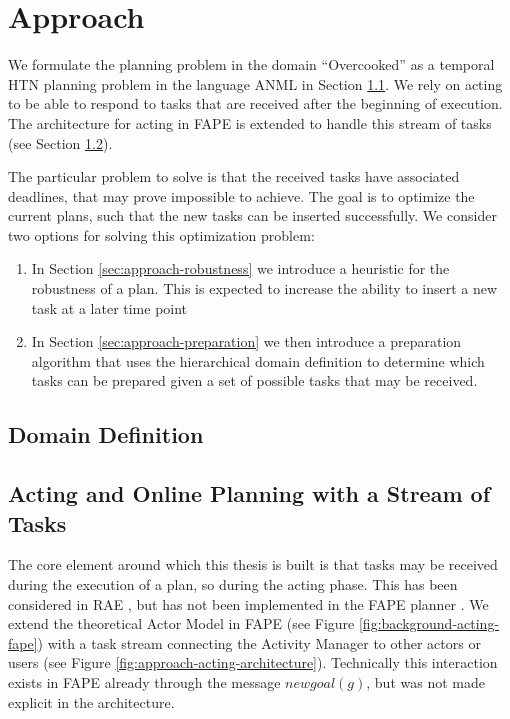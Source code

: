 \section{Approach}\label{sec:approach}


We formulate the planning problem in the domain ``Overcooked'' as a temporal HTN planning problem in the language ANML in Section \ref{sec:approach-domain}.
We rely on acting to be able to respond to tasks that are received after the beginning of execution.
The architecture for acting in FAPE \cite{bit-monnotTemporalHierarchicalModels2016a} is extended to handle this stream of tasks (see Section \ref{sec:approach-acting}).

The particular problem to solve is that the received tasks have associated deadlines, that may prove impossible to achieve.
The goal is to optimize the current plans, such that the new tasks can be inserted successfully.
We consider two options for solving this optimization problem:

\begin{enumerate}
    \item In Section \ref{sec:approach-robustness} we introduce a heuristic for the robustness of a plan. This is expected to increase the ability to insert a new task at a later time point
    \item In Section \ref{sec:approach-preparation} we then introduce a preparation algorithm that uses the hierarchical domain definition to determine which tasks can be prepared given a set of possible tasks that may be received.
\end{enumerate}

\subsection{Domain Definition}
\label{sec:approach-domain}

\subsection{Acting and Online Planning with a Stream of Tasks}
\label{sec:approach-acting}

The core element around which this thesis is built is that tasks may be received during the execution of a plan, so during the acting phase.
This has been considered in RAE \citep{ghallabAutomatedPlanningActing2016}, but has not been implemented in the FAPE planner \citep{bit-monnotTemporalHierarchicalModels2016a}.
We extend the theoretical Actor Model in FAPE (see Figure \ref{fig:background-acting-fape}) with a task stream connecting the Activity Manager to other actors or users (see Figure \ref{fig:approach-acting-architecture}).
Technically this interaction exists in FAPE already through the message $newgoal(g)$, but was not made explicit in the architecture.


